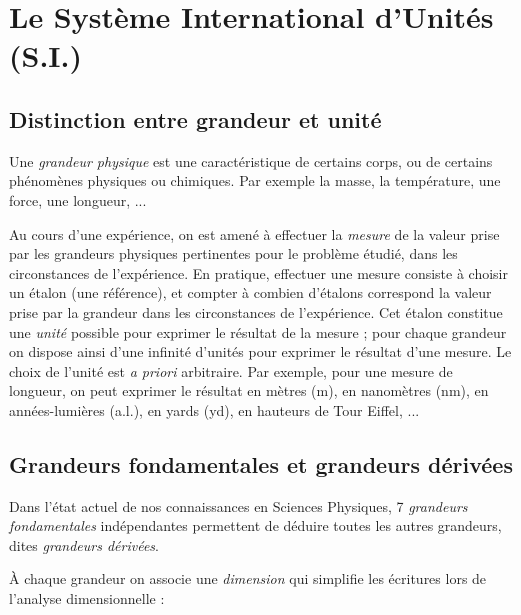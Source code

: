 \documentclass[MPSI]{tp}
\begin{document}
\newcommand{\ex}{Ex : }
\newcommand{\Ex}[1]{\\ Ex : #1\\}
\newcommand{\exemple}[1]{\\ Ex : #1\\}
\newcommand{\ie}{c.-à-d.}
\newcommand{\rem}{Remarque : }


\section{Le Système International d'Unités (S.I.)}

\subsection{Distinction entre grandeur et unité}

Une \emph{grandeur physique} est une caractéristique de certains corps, ou de certains phénomènes physiques ou chimiques. Par exemple la masse, la température, une force, une longueur, ...

Au cours d'une expérience, on est amené à effectuer la \emph{mesure} de la valeur prise par les grandeurs physiques pertinentes pour le problème étudié, dans les circonstances de l'expérience. En pratique, effectuer une mesure consiste à choisir un étalon (une référence), et compter à combien d'étalons correspond la valeur prise par la grandeur dans les circonstances de l'expérience. Cet étalon constitue une \emph{unité} possible pour exprimer le résultat de la mesure ; pour chaque grandeur on dispose ainsi d'une infinité d'unités pour exprimer le résultat d'une mesure. Le choix de l'unité est \textit{a priori} arbitraire.
Par exemple, pour une mesure de longueur, on peut exprimer le résultat en mètres (m), en nanomètres (nm), en années-lumières (a.l.), en yards (yd), en hauteurs de Tour Eiffel, ...


\subsection{Grandeurs fondamentales et grandeurs dérivées}

Dans l'état actuel de nos connaissances en Sciences Physiques, 7 \emph{grandeurs fondamentales} indépendantes permettent de déduire toutes les autres grandeurs, dites \emph{grandeurs dérivées}.

À chaque grandeur on associe une \emph{dimension} qui simplifie les écritures lors de l'analyse dimensionnelle :
\end{document}
